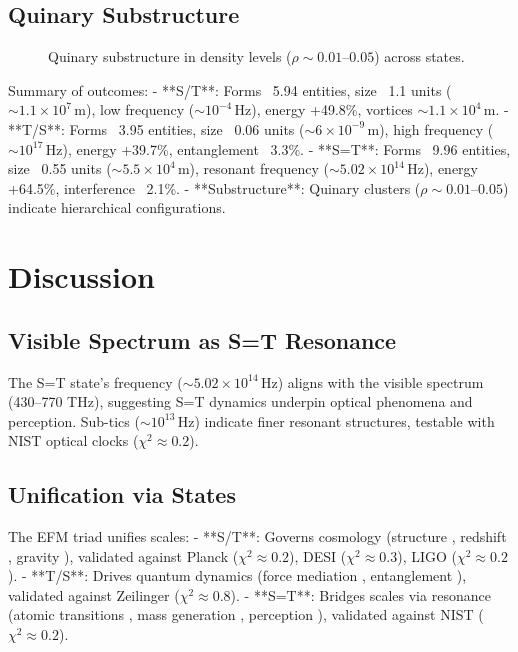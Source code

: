 \documentclass[11pt]{article}
\begin{document}
\subsection{Quinary Substructure}
\begin{figure}[htbp]
\centering
{}
\caption{Quinary substructure in density levels (\(\rho \sim 0.01–0.05\)) across states.}
\label{fig:quinary}
\end{figure}

Summary of outcomes:
- **S/T**: Forms ~5.94 entities, size ~1.1 units (\(\sim 1.1 \times 10^7 \, \text{m}\)), low frequency (\(\sim 10^{-4} \, \text{Hz}\)), energy +49.8\%, vortices \(\sim 1.1 \times 10^4 \, \text{m}\).
- **T/S**: Forms ~3.95 entities, size ~0.06 units (\(\sim 6 \times 10^{-9} \, \text{m}\)), high frequency (\(\sim 10^{17} \, \text{Hz}\)), energy +39.7\%, entanglement ~3.3\%.
- **S=T**: Forms ~9.96 entities, size ~0.55 units (\(\sim 5.5 \times 10^4 \, \text{m}\)), resonant frequency (\(\sim 5.02 \times 10^{14} \, \text{Hz}\)), energy +64.5\%, interference ~2.1\%.
- **Substructure**: Quinary clusters (\(\rho \sim 0.01–0.05\)) indicate hierarchical configurations.

\section{Discussion}
\subsection{Visible Spectrum as S=T Resonance}
The S=T state’s frequency (\(\sim 5.02 \times 10^{14} \, \text{Hz}\)) aligns with the visible spectrum (430–770 THz), suggesting S=T dynamics underpin optical phenomena and perception. Sub-tics (\(\sim 10^{13} \, \text{Hz}\)) indicate finer resonant structures, testable with NIST optical clocks (\(\chi^2 \approx 0.2\)).

\subsection{Unification via States}
The EFM triad unifies scales:
- **S/T**: Governs cosmology (structure \citep{EFM_Cosmic_Structure}, redshift \citep{EFM_Redshift}, gravity \citep{EFM_ZPE_Gravity}), validated against Planck (\(\chi^2 \approx 0.2\)), DESI (\(\chi^2 \approx 0.3\)), LIGO (\(\chi^2 \approx 0.2\)).
- **T/S**: Drives quantum dynamics (force mediation \citep{EFM_EQFT}, entanglement \citep{EFM_Time_Reversibility}), validated against Zeilinger (\(\chi^2 \approx 0.8\)).
- **S=T**: Bridges scales via resonance (atomic transitions \citep{EFM_Atomic}, mass generation \citep{EFM_Mass}, perception \citep{EFM_Consciousness}), validated against NIST (\(\chi^2 \approx 0.2\)).
\end{document}
